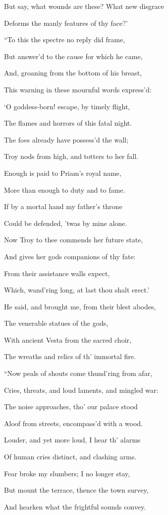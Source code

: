 But say, what wounds are these? What new disgrace

Deforms the manly features of thy face?’

“To this the spectre no reply did frame,

But answer’d to the cause for which he came,

And, groaning from the bottom of his breast,

This warning in these mournful words express’d:

‘O goddess-born! escape, by timely flight,

The flames and horrors of this fatal night.

The foes already have possess’d the wall;

Troy nods from high, and totters to her fall.

Enough is paid to Priam’s royal name,

More than enough to duty and to fame.

If by a mortal hand my father’s throne

Could be defended, ’twas by mine alone.

Now Troy to thee commends her future state,

And gives her gods companions of thy fate:

From their assistance walls expect,

Which, wand’ring long, at last thou shalt erect.’

He said, and brought me, from their blest abodes,

The venerable statues of the gods,

With ancient Vesta from the sacred choir,

The wreaths and relics of th’ immortal fire.

“Now peals of shouts come thund’ring from afar,

Cries, threats, and loud laments, and mingled war:

The noise approaches, tho’ our palace stood

Aloof from streets, encompass’d with a wood.

Louder, and yet more loud, I hear th’ alarms

Of human cries distinct, and clashing arms.

Fear broke my slumbers; I no longer stay,

But mount the terrace, thence the town survey,

And hearken what the frightful sounds convey.

